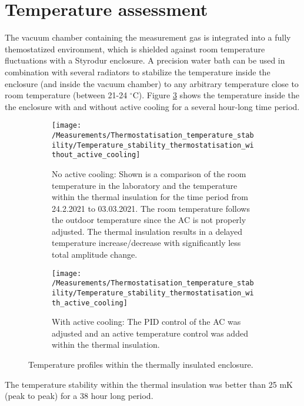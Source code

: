 \section{Temperature assessment}
The vacuum chamber containing the measurement gas is integrated into a fully themostatized environment, which is shielded against room temperature fluctuations with a Styrodur enclosure. A precision water bath can be used in combination with several radiators to stabilize the temperature inside the enclosure (and inside the vacuum chamber) to any arbitrary temperature close to room temperature (between 21-24 $^{\circ}$C). Figure \ref{fig:roomtemperature_stabilization} shows the temperature inside the the enclosure with and without active cooling for a several hour-long time period.
\begin{figure}[H]
	\begin{subfigure}[t]{.48\textwidth}
		\centering 
		\texttt{[image: /Measurements/Thermostatisation\_temperature\_stability/Temperature\_stability\_thermostatisation\_without\_active\_cooling]}
		\caption{No active cooling: Shown is a comparison of the room temperature in the laboratory and the temperature within the thermal insulation for the time period from 24.2.2021 to 03.03.2021. The room temperature follows the outdoor temperature since the AC is not properly adjusted. The thermal insulation results in a delayed temperature increase/decrease with significantly less total amplitude change.\hfill}
		\label{fig:roomtemp_1}
	\end{subfigure}
	\hfill
	\begin{subfigure}[t]{.48\textwidth}
		\centering
		\texttt{[image: /Measurements/Thermostatisation\_temperature\_stability/Temperature\_stability\_thermostatisation\_with\_active\_cooling]}
		\caption{With active cooling: The PID control of the AC was adjusted and an active temperature control was added within the thermal insulation.}
		\label{fig:roomtemp_2}
	\end{subfigure}
\caption{Temperature profiles within the thermally insulated enclosure.}
\label{fig:roomtemperature_stabilization}
\end{figure}
\noindent
The temperature stability within the thermal insulation was better than 25 mK (peak to peak) for a 38 hour long period. \\\\
\noindent
